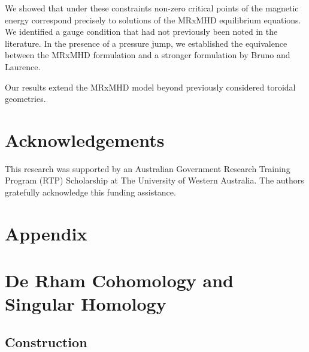 \documentclass[11pt]{article}
\theoremstyle{plain}
\theoremstyle{definition}
\theoremstyle{remark}
\begin{document}
We showed that under these constraints non-zero critical points of the magnetic energy correspond precisely to solutions of the MRxMHD equilibrium equations. We identified a gauge condition that had not previously been noted in the literature. In the presence of a pressure jump, we established the equivalence between the MRxMHD formulation and a stronger formulation by Bruno and Laurence.


Our results extend the MRxMHD model beyond previously considered toroidal geometries. 




\section{Acknowledgements}\label{section:Acknowledgements}
This research was supported by an Australian Government Research Training Program (RTP) Scholarship at The University of Western Australia. The authors gratefully acknowledge this funding assistance.




%






\newpage
\section*{Appendix}
\appendix



\section{De Rham Cohomology and Singular Homology}\label{section:Homology cohomology construction}


\subsection{Construction} \label{sub:construct}
\end{document}
